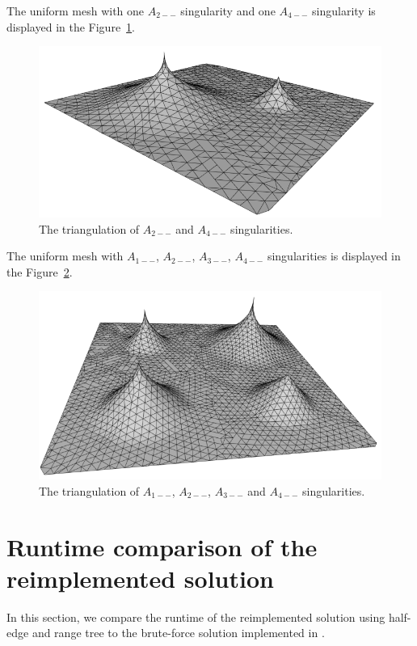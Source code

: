 The uniform mesh with one $A_{2--}$ singularity and one $A_{4--}$ singularity
is displayed in the Figure~\ref{img:86}.

\begin{figure}[h!]
    \centerline{\includegraphics[scale=0.5]{images/img86}}
    \caption[The triangulation of $A_{2--}$ and $A_{4--}$ singularities]
    {The triangulation of  $A_{2--}$ and $A_{4--}$ singularities.}
    \label{img:86}
\end{figure}

The uniform mesh with $A_{1--}$, $A_{2--}$, $A_{3--}$, $A_{4--}$ singularities
is displayed in the Figure~\ref{img:87}.

\begin{figure}[h!]
    \centerline{\includegraphics[scale=0.5]{images/img87}}
    \caption[The triangulation of $A_{1--}$, $A_{2--}$, $A_{3--}$ and $A_{4--}$ singularities]
    {The triangulation of $A_{1--}$, $A_{2--}$, $A_{3--}$ and $A_{4--}$ singularities.}
    \label{img:87}
\end{figure}

\section{Runtime comparison of the reimplemented solution}
\label{sub4.3}
In this section, we compare the runtime of the reimplemented solution using half-edge 
and range tree to the brute-force solution implemented in \cite{korecova2021triangulation}.

